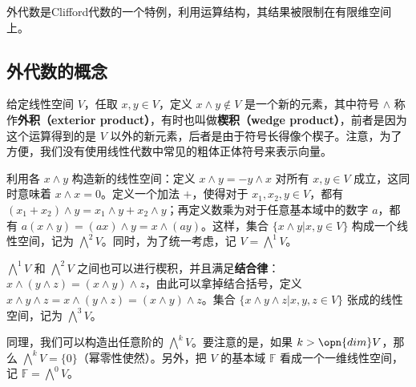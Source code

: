 
外代数是Clifford代数的一个特例，利用运算结构，其结果被限制在有限维空间上。

\subsection{外代数的概念}

给定线性空间 $V$，任取 $x, y\in V$，定义 $x\wedge y\not\in V$ 是一个新的元素，其中符号 $\wedge$ 称作\textbf{外积（exterior product）}，有时也叫做\textbf{楔积（wedge product）}，前者是因为这个运算得到的是 $V$ 以外的新元素，后者是由于符号长得像个楔子。注意，为了方便，我们没有使用线性代数中常见的粗体正体符号来表示向量。

利用各 $x\wedge y$ 构造新的线性空间：定义 $x\wedge y=-y\wedge x$ 对所有 $x, y\in V$ 成立，这同时意味着 $x\wedge x=0$。定义一个加法 $+$，使得对于 $x_1, x_2, y\in V$，都有 $(x_1+x_2)\wedge y=x_1\wedge y+x_2\wedge y$；再定义数乘为对于任意基本域中的数字 $a$，都有 $a(x\wedge y)=(ax)\wedge y=x\wedge(ay)$。这样，集合 $\{x\wedge y|x, y\in V\}$ 构成一个线性空间，记为 $\bigwedge^2 V$。同时，为了统一考虑，记 $V=\bigwedge^1 V$。

$\bigwedge^1 V$ 和 $\bigwedge^2 V$ 之间也可以进行楔积，并且满足\textbf{结合律}：$x\wedge(y\wedge z)=(x\wedge y)\wedge z$，由此可以拿掉结合括号，定义 $x\wedge y\wedge z=x\wedge(y\wedge z)=(x\wedge y)\wedge z$。集合 $\{x\wedge y\wedge z|x, y, z\in V\}$ 张成的线性空间，记为 $\bigwedge^3 V$。

同理，我们可以构造出任意阶的 $\bigwedge^k V$。要注意的是，如果 $k>\opn{dim} V$，那么 $\bigwedge^k V=\{0\}$（幂零性使然）。另外，把 $V$ 的基本域 $\mathbb{F}$ 看成一个一维线性空间，记 $\mathbb{F}=\bigwedge^0 V$。

